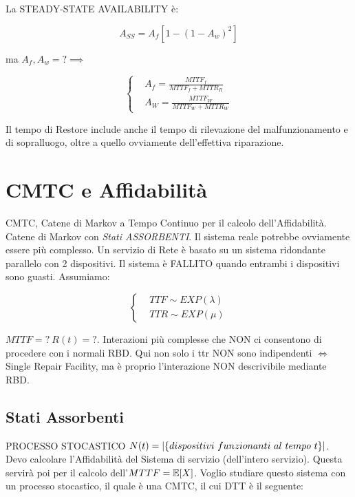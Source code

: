 La STEADY-STATE AVAILABILITY è:

\[
	A_{SS} = A_f[1-(1-A_w)^2]
\]

ma $A_f,A_w = ? \implies$

\[
	\left\{
	\begin{aligned}
	&A_f = \frac{MTTF_f}{MTTF_f+MTTR_R}\\
	&A_W = \frac{MTTF_W}{MTTF_W+MTTR_W}
	\end{aligned}
	\right.
\]

Il tempo di Restore include anche il tempo di rilevazione del malfunzionamento e di sopralluogo, oltre a quello ovviamente dell'effettiva riparazione.

\section{CMTC e Affidabilità}

CMTC, Catene di Markov a Tempo Continuo per il calcolo dell'Affidabilità. Catene di Markov con \textit{Stati ASSORBENTI}. Il sistema reale potrebbe ovviamente essere più complesso. Un servizio di Rete è basato su un sistema ridondante parallelo con 2 dispositivi. Il sistema è FALLITO quando entrambi i dispositivi sono guasti. Assumiamo: 

\[
	\left\{
	\begin{aligned}
	&TTF \sim EXP(\lambda)\\
	&TTR \sim EXP(\mu)
	\end{aligned}
	\right.
\]

$MTTF=?\ R(t)=?$. Interazioni più complesse che NON ci consentono di procedere con i normali RBD. Qui non solo i ttr NON sono indipendenti $\iff$ Single Repair Facility, ma è proprio l'interazione NON descrivibile mediante RBD.

\subsection{Stati Assorbenti}

PROCESSO STOCASTICO $N(t)=\cardinality{\{dispositivi\ funzionanti\ al\ tempo\ t\}}$. Devo calcolare l'Affidabilità del Sistema di servizio (dell'intero servizio). Questa servirà poi per il calcolo dell'$MTTF=\operatorname{\mathbb{E}}[X]$. Voglio studiare questo sistema con un processo stocastico, il quale è una CMTC, il cui DTT è il seguente:

\begin{center}
\end{center}

